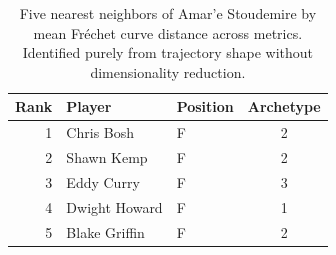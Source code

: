 \begin{table}[htbp]
  \centering\small
  \begin{tabular}{rllc}
    \toprule
    Rank & Player & Position & Archetype \\
    \midrule
    1 & Chris Bosh & F & 2 \\
    2 & Shawn Kemp & F & 2 \\
    3 & Eddy Curry & F & 3 \\
    4 & Dwight Howard & F & 1 \\
    5 & Blake Griffin & F & 2 \\
    \bottomrule
  \end{tabular}
  \caption{Five nearest neighbors of Amar'e Stoudemire by mean Fr\'{e}chet curve distance across metrics. Identified purely from trajectory shape without dimensionality reduction.}
  \label{tab:Amar_e_Stoudemire_frechet_curve_neighbors}
\end{table}

